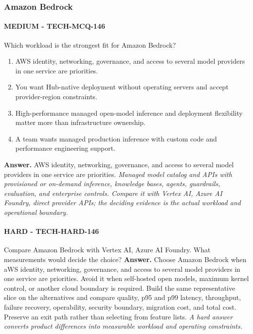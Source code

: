 \subsubsection*{Amazon Bedrock}
\paragraph{MEDIUM - TECH-MCQ-146} Which workload is the strongest fit for Amazon Bedrock?
\begin{enumerate}[label=\Alph*.]
\item AWS identity, networking, governance, and access to several model providers in one service are priorities.
\item You want Hub-native deployment without operating servers and accept provider-region constraints.
\item High-performance managed open-model inference and deployment flexibility matter more than infrastructure ownership.
\item A team wants managed production inference with custom code and performance engineering support.
\end{enumerate}
\textbf{Answer.} AWS identity, networking, governance, and access to several model providers in one service are priorities.
\textit{Managed model catalog and APIs with provisioned or on-demand inference, knowledge bases, agents, guardrails, evaluation, and enterprise controls. Compare it with Vertex AI, Azure AI Foundry, direct provider APIs; the deciding evidence is the actual workload and operational boundary.}
\paragraph{HARD - TECH-HARD-146} Compare Amazon Bedrock with Vertex AI, Azure AI Foundry. What measurements would decide the choice?
\textbf{Answer.} Choose Amazon Bedrock when aWS identity, networking, governance, and access to several model providers in one service are priorities. Avoid it when self-hosted open models, maximum kernel control, or another cloud boundary is required. Build the same representative slice on the alternatives and compare quality, p95 and p99 latency, throughput, failure recovery, operability, security boundary, migration cost, and total cost. Preserve an exit path rather than selecting from feature lists.
\textit{A hard answer converts product differences into measurable workload and operating constraints.}
